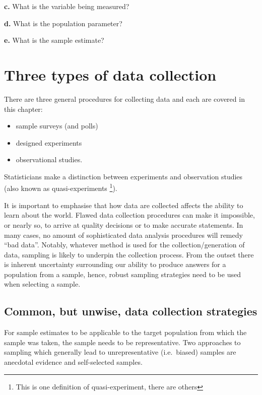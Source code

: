 \documentclass[
  oneside]{krantz}
\begin{document}
\textbf{c.} What is the variable being measured?

\textbf{d.} What is the population parameter?

\textbf{e.} What is the sample estimate?

\hypertarget{three-types-of-data-collection}{%
\section{Three types of data collection}\label{three-types-of-data-collection}}

There are three general procedures for collecting data and each are covered in this chapter:

\begin{itemize}
\item
  sample surveys (and polls)
\item
  designed experiments
\item
  observational studies.
\end{itemize}

Statisticians make a distinction between experiments and observation studies (also known as quasi-experiments \footnote{This is one definition of quasi-experiment, there are others}).

It is important to emphasise that how data are collected affects the ability to learn about the world. Flawed data collection procedures can make it impossible, or nearly so, to arrive at quality decisions or to make accurate statements. In many cases, no amount of sophisticated data analysis procedures will remedy ``bad data''. Notably, whatever method is used for the collection/generation of data, sampling is likely to underpin the collection process. From the outset there is inherent uncertainty surrounding our ability to produce answers for a population from a sample, hence, robust sampling strategies need to be used when selecting a sample.

\hypertarget{common-but-unwise-data-collection-strategies}{%
\subsection{Common, but unwise, data collection strategies}\label{common-but-unwise-data-collection-strategies}}

For sample estimates to be applicable to the target population from which the sample was taken, the sample needs to be representative. Two approaches to sampling which generally lead to unrepresentative (i.e.~biased) samples are anecdotal evidence and self-selected samples.
\end{document}
